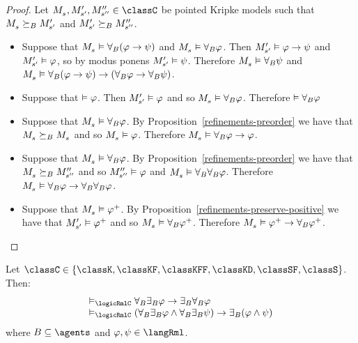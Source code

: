 \begin{proof}
Let $\kPModel{\kStateS}, \kPModelP{\kStateSP}, \kPModelPP{\kStateSPP} \in \classC$ be pointed Kripke models such that $\kPModel{\kStateS} \simulatesBs \kPModelP{\kStateSP}$ and ${M^{\prime}_{{s}^{\prime}}} \succeq_{B} {M^{\prime\prime}_{{s}^{\prime\prime}}}$.
\begin{itemize}
    \item 
        Suppose that $\kPModel{\kStateS} \entails \allrefsBs (\phi \implies \psi)$ and $\kPModel{\kStateS} \entails \allrefsBs \phi$.
        Then ${M^{\prime}_{{s}^{\prime}}} \vDash \varphi \rightarrow \psi$
        and ${M^{\prime}_{{s}^{\prime}}} \vDash \varphi$,
        so by modus ponens ${M^{\prime}_{{s}^{\prime}}} \vDash \psi$.
        Therefore $\kPModel{\kStateS} \entails \allrefsBs \psi$
        and $\kPModel{\kStateS} \entails \allrefsBs (\phi \implies \psi) \implies (\allrefsBs \phi \implies \allrefsBs \psi)$.
    \item
        Suppose that $\vDash \varphi$. 
        Then ${M^{\prime}_{{s}^{\prime}}} \vDash \varphi$ and so $\kPModel{\kStateS} \entails \allrefsBs \phi$.
        Therefore $\vDash {\forall_{B}} \varphi$
    \item
        Suppose that $\kPModel{\kStateS} \entails \allrefsBs \phi$.
        By Proposition~\ref{refinements-preorder} we have that $\kPModel{\kStateS} \simulatesBs \kPModel{\kStateS}$ and so $\kPModel{\kStateS} \entails \phi$.
        Therefore $\kPModel{\kStateS} \entails \allrefsBs \phi \implies \phi$.
    \item
        Suppose that $\kPModel{\kStateS} \entails \allrefsBs \phi$.
        By Proposition~\ref{refinements-preorder} we have that $\kPModel{\kStateS} \simulatesBs \kPModelPP{\kStateSPP}$ and so ${M^{\prime\prime}_{{s}^{\prime\prime}}} \vDash \varphi$ and $\kPModel{\kStateS} \entails \allrefsBs \allrefsBs \phi$.
        Therefore $\kPModel{\kStateS} \entails \allrefsBs \phi \implies \allrefsBs \allrefsBs \phi$.
    \item
        Suppose that $\kPModel{\kStateS} \entails \phi^+$.
        By Proposition~\ref{refinements-preserve-positive} we have that ${M^{\prime}_{{s}^{\prime}}} \vDash \varphi^+$ and so $\kPModel{\kStateS} \entails \allrefsBs \phi^+$.
        Therefore $\kPModel{\kStateS} \entails \phi^+ \implies \allrefsBs \phi^+$.
\end{itemize}
\end{proof}

\begin{proposition}\label{rml-mckinsey}
Let $\classC \in \{\classK, \classKF, \classKFF, \classKD, \classSF, \classS\}$. Then:
$$
\begin{array}{l}
    \entails_\logicRmlC \allrefsBs \somerefsBs \phi \implies \somerefsBs \allrefsBs \phi\\
    \entails_\logicRmlC (\allrefsBs \somerefsBs \phi \land \allrefsBs \somerefsBs \psi) \implies \somerefsBs (\phi \land \psi)
\end{array}
$$
where $\agentsB \subseteq \agents$ and $\phi, \psi \in \langRml$.
\end{proposition}

